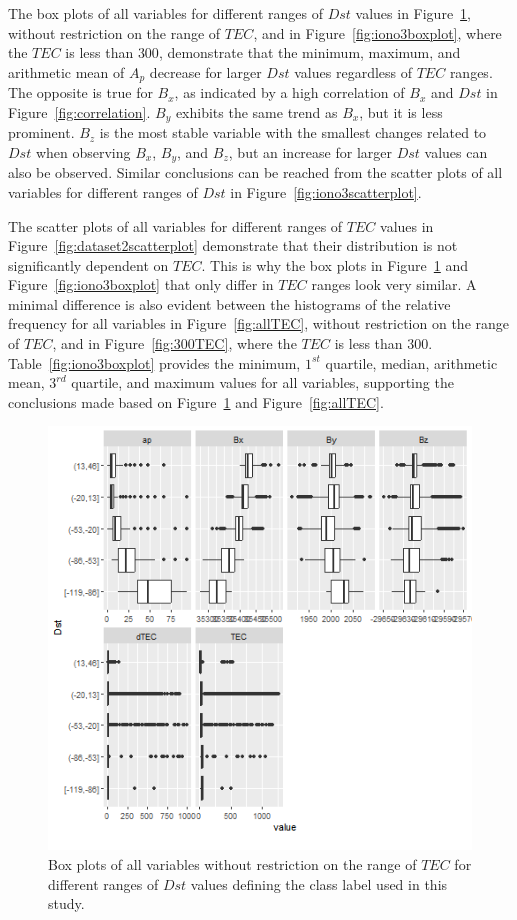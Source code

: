 \documentclass[sn-mathphys-num]{sn-jnl}%
\begin{document}
The box plots of all variables for different ranges of $Dst$ values in Figure~\ref{fig:dataset2boxplot}, without restriction on the range of $TEC$, and in Figure~\ref{fig:iono3boxplot}, where the $TEC$ is less than $300$, demonstrate that the minimum, maximum, and arithmetic mean of $A_{p}$ decrease for larger $Dst$ values regardless of $TEC$ ranges. The opposite is true for $B_{x}$, as indicated by a high correlation of $B_{x}$ and $Dst$ in Figure~\ref{fig:correlation}. $B_{y}$ exhibits the same trend as $B_{x}$, but it is less prominent. $B_{z}$ is the most stable variable with the smallest changes related to $Dst$ when observing $B_{x}$, $B_{y}$, and $B_{z}$, but an increase for larger $Dst$ values can also be observed. Similar conclusions can be reached from the scatter plots of all variables for different ranges of $Dst$ in Figure~\ref{fig:iono3scatterplot}. 

The scatter plots of all variables for different ranges of $TEC$ values in Figure~\ref{fig:dataset2scatterplot} demonstrate that their distribution is not significantly dependent on $TEC$. This is why the box plots in Figure~\ref{fig:dataset2boxplot} and Figure~\ref{fig:iono3boxplot} that only differ in $TEC$ ranges look very similar. A minimal difference is also evident between the histograms of the relative frequency for all variables in Figure~\ref{fig:allTEC}, without restriction on the range of $TEC$, and in Figure~\ref{fig:300TEC}, where the $TEC$ is less than $300$. Table~\ref{fig:iono3boxplot} provides the minimum, $1^{st}$ quartile, median, arithmetic mean, $3^{rd}$ quartile, and maximum values for all variables, supporting the conclusions made based on Figure~\ref{fig:dataset2boxplot} and Figure~\ref{fig:allTEC}.

\begin{figure}
    \centering
    \includegraphics[width=0.9\linewidth]{dataset2boxplot.png}
    \caption{Box plots of all variables without restriction on the range of $TEC$ for different ranges of $Dst$ values defining the class label used in this study.}
    \label{fig:dataset2boxplot}
\end{figure}
\end{document}
